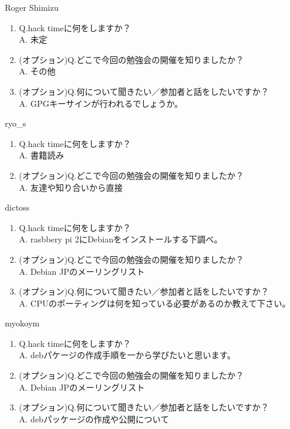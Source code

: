 \begin{prework}{ Roger Shimizu }
  \begin{enumerate}
  \item Q.hack timeに何をしますか？\\
    A. 未定
  \item (オプション)Q.どこで今回の勉強会の開催を知りましたか？\\
    A. その他
  \item (オプション)Q.何について聞きたい／参加者と話をしたいですか？\\
    A. GPGキーサインが行われるでしょうか。
  \end{enumerate}
\end{prework}

\begin{prework}{ ryo\_s }
  \begin{enumerate}
  \item Q.hack timeに何をしますか？\\
    A. 書籍読み
  \item (オプション)Q.どこで今回の勉強会の開催を知りましたか？\\
    A. 友達や知り合いから直接
  \end{enumerate}
\end{prework}

\begin{prework}{ dictoss }
  \begin{enumerate}
  \item Q.hack timeに何をしますか？\\
    A. rasbbery pi 2にDebianをインストールする下調べ。
  \item (オプション)Q.どこで今回の勉強会の開催を知りましたか？\\
    A. Debian JPのメーリングリスト
  \item (オプション)Q.何について聞きたい／参加者と話をしたいですか？\\
    A. CPUのポーティングは何を知っている必要があるのか教えて下さい。
  \end{enumerate}
\end{prework}

\begin{prework}{ myokoym }
  \begin{enumerate}
  \item Q.hack timeに何をしますか？\\
    A. debパケージの作成手順を一から学びたいと思います。
  \item (オプション)Q.どこで今回の勉強会の開催を知りましたか？\\
    A. Debian JPのメーリングリスト
  \item (オプション)Q.何について聞きたい／参加者と話をしたいですか？\\
    A. debパッケージの作成や公開について
  \end{enumerate}
\end{prework}

